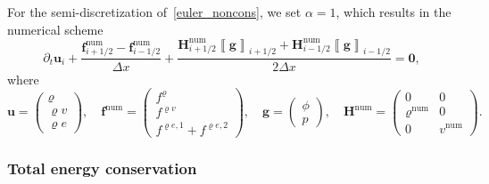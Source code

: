\documentclass[]{scrartcl}
\renewcommand{\vec}[1]{\boldsymbol{#1}}
\newcommand{\jump}[1]{\left\llbracket #1  \right\rrbracket}
\theoremstyle{definition}
\begin{document}
For the semi-discretization of~\eqref{euler_noncons}, we set $\alpha = 1$, which results in the numerical scheme
\begin{equation}
    \partial_t \vec{u}_i
    + \frac{\vec{f}^{\mathrm{num}}_{i+1/2} - \vec{f}^{\mathrm{num}}_{i-1/2}}{\Delta x}
    + \frac{\vec{H}^{\mathrm{num}}_{i+1/2}\jump{\vec{g}}_{i+1/2} + \vec{H}^{\mathrm{num}}_{i-1/2}\jump{\vec{g}}_{i-1/2}}{2 \Delta x}
    = \vec{0},
\label{euler_noncons_semi}
\end{equation}
where
\begin{equation}
\vec{u} =
\begin{pmatrix}
\varrho \\
\varrho v \\
\varrho e
\end{pmatrix},
\quad
\vec{f}^{\mathrm{num}} =
\begin{pmatrix}
f^{\varrho} \\
f^{\varrho v} \\
f^{\varrho e,1} + f^{\varrho e,2}
\end{pmatrix},
\quad
\vec{g} =
\begin{pmatrix}
\phi \\
p
\end{pmatrix},
\quad
\vec{H}^{\mathrm{num}} =
\begin{pmatrix}
0 & 0 \\
\varrho^{\mathrm{num}} & 0 \\
0 & v^{\mathrm{num}}
\end{pmatrix}.
\label{euler_noncons_fluxes}
\end{equation}

\subsubsection{Total energy conservation}
\end{document}
